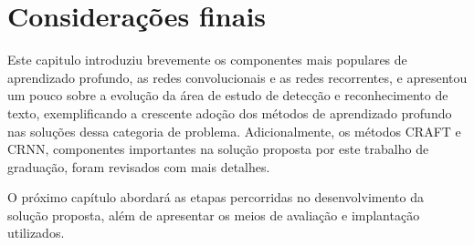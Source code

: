 \section{Considerações finais}
Este capitulo introduziu brevemente os componentes mais populares de aprendizado profundo, as redes convolucionais e as redes recorrentes, e apresentou um pouco sobre a evolução da área de estudo de detecção e reconhecimento de texto, exemplificando a crescente adoção dos métodos de aprendizado profundo nas soluções dessa categoria de problema. Adicionalmente, os métodos CRAFT e CRNN, componentes importantes na solução proposta por este trabalho de graduação, foram revisados com mais detalhes.

O próximo capítulo abordará as etapas percorridas no desenvolvimento da solução proposta, além de apresentar os meios de avaliação e implantação utilizados.